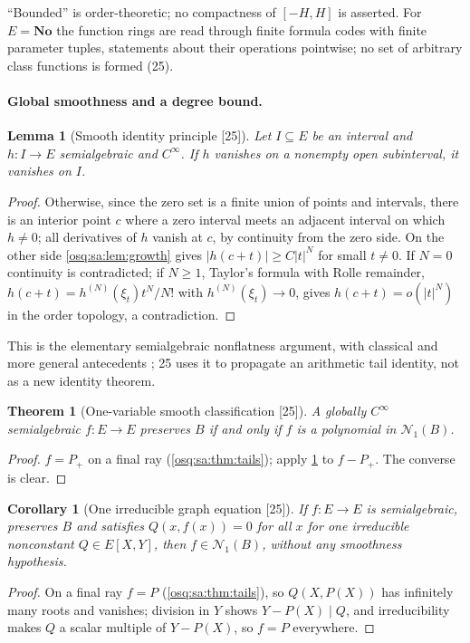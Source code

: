 \documentclass[11pt,letterpaper]{article}
\numberwithin{equation}{section}
\newtheorem{theorem}{Theorem}[section]
\newtheorem{lemma}[lemma]{Lemma}
\newtheorem{corollary}[corollary]{Corollary}
\theoremstyle{definition}
\theoremstyle{remark}
\theoremstyle{plain}
\newcommand{\No}{\mathbf{No}}
\newcommand{\Num}{\mathscr N}
\newcommand{\src}[1]{\textup{\textsf{[#1]}}}
\begin{document}
``Bounded'' is order-theoretic; no compactness of $[-H,H]$ is asserted. For $E=\No$ the function rings are read through finite formula codes with
finite parameter tuples, statements about their operations pointwise; no set of arbitrary class functions is formed (25).

\paragraph{Global smoothness and a degree bound.}

\begin{lemma}[Smooth identity principle \src{25}]\label{osq:sa:lem:identity}
Let $I\subseteq E$ be an interval and $h:I\to E$ semialgebraic and $C^\infty$. If $h$ vanishes on a nonempty open subinterval, it vanishes on $I$.
\end{lemma}
\begin{proof}
Otherwise, since the zero set is a finite union of points and intervals, there is an interior point $c$ where a zero interval meets an adjacent interval
on which $h\ne0$; all derivatives of $h$ vanish at $c$, by continuity from the zero side. On the other side \cref{osq:sa:lem:growth} gives $|h(c+t)|\ge
C|t|^N$ for small $t\ne0$. If $N=0$ continuity is contradicted; if $N\ge1$, Taylor's formula with Rolle remainder, $h(c+t)=h^{(N)}(\xi_t)t^N/N!$ with
$h^{(N)}(\xi_t)\to0$, gives $h(c+t)=o(|t|^N)$ in the order topology, a contradiction.
\end{proof}

This is the elementary semialgebraic nonflatness argument, with classical and more general antecedents \cite{Miller,BCR}; 25 uses it to propagate an
arithmetic tail identity, not as a new identity theorem.

\begin{theorem}[One-variable smooth classification \src{25}]\label{osq:sa:thm:smoothone}
A globally $C^\infty$ semialgebraic $f:E\to E$ preserves $B$ if and only if $f$ is a polynomial in $\Num_1(B)$.
\end{theorem}
\begin{proof}
$f=P_+$ on a final ray (\cref{osq:sa:thm:tails}); apply \cref{osq:sa:lem:identity} to $f-P_+$. The converse is clear.
\end{proof}

\begin{corollary}[One irreducible graph equation \src{25}]\label{osq:sa:cor:irreducible}
If $f:E\to E$ is semialgebraic, preserves $B$ and satisfies $Q(x,f(x))=0$ for all $x$ for one irreducible nonconstant $Q\in E[X,Y]$, then $f\in\Num_1(B)$,
without any smoothness hypothesis.
\end{corollary}
\begin{proof}
On a final ray $f=P$ (\cref{osq:sa:thm:tails}), so $Q(X,P(X))$ has infinitely many roots and vanishes; division in $Y$ shows $Y-P(X)\mid Q$, and
irreducibility makes $Q$ a scalar multiple of $Y-P(X)$, so $f=P$ everywhere.
\end{proof}
\end{document}
